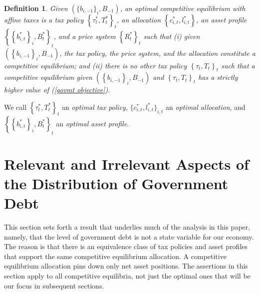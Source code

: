 \documentclass[thmsb,11pt]{article}
\newtheorem{definition}{Definition}
\begin{document}
\begin{definition}
\label{Def: optimal CE affine} Given $(\{b_{i,-1}\}_{i},B_{-1})$, an
optimal competitive equilibrium with affine taxes is a tax
policy $\left\{ \tau _{t}^{\ast },T_{t}^{\ast }\right\} _{t}$, an allocation
$ \left\{ c_{i,t}^{\ast },l_{i,t}^{\ast } \right\}$, an asset profile
$\left\{\left\{b_{i,t}^{\ast }\right\}
_{i},B_{t}^{\ast }\right\} _{t}$, and a price system $\left\{ R_{t}^{\ast
}\right\} _{t}$ such that (i) given $\left( \left\{ b_{i,-1}\right\}
_{i},B_{-1}\right) $, the tax policy,  %
 the price system, %
and the allocation %
constitute a competitive equilibrium; and (ii) there is no other tax policy $%
\left\{ \tau _{t},T_{t}\right\} _{t}$ such that a competitive equilibrium
given $\left( \left\{ b_{i,-1}\right\} _{i},B_{-1}\right) $ and $\left\{
\tau _{t},T_{t}\right\} _{t}$ has a strictly higher value of (\ref{govmt
objective})$.$
\end{definition}

\smallskip We  call $\left \{ \tau _{t}^{\ast },T_{t}^{\ast }\right \}
_{t}$ an \textit{optimal tax policy}, $\{c_{i,t}^{\ast },l_{i,t}^{\ast
}\}_{i,t}$ an \textit{optimal allocation}, and $\left \{ \left \{
b_{i,t}^{\ast }\right \} _{i},B_{t}^{\ast }\right \} _{t}$ an \textit{%
optimal asset profile}.

\section{\protect\smallskip Relevant and Irrelevant Aspects of  the Distribution of Government Debt\label{sec:Ricardian101}}
%
This section sets forth  a  result that underlies much of the analysis in this paper, namely, that  the level
of government debt is not a state variable for our economy.  The reason is that there is an equivalence class of tax policies and asset profiles that support the same competitive equilibrium allocation.
A competitive  equilibrium allocation pins down only net asset  positions.
The assertions in this section apply to all competitive equilibria, not just the optimal ones that will be our focus in subsequent sections.
\end{document}
